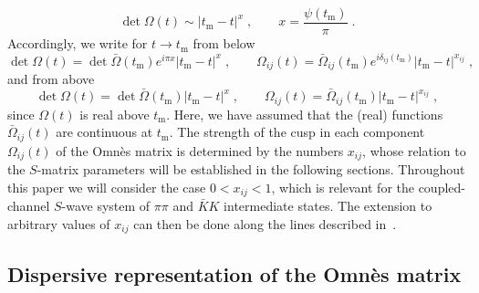 \documentclass[11pt]{article}%
\providecommand{\ec}{\;,}
\providecommand{\ep}{\;.}
\newcommand{\tm}{t_\text{m}}
\newcommand{\beq}{\begin{equation}}
\newcommand{\eeq}{\end{equation}}
\begin{document}
\beq
\label{det_asym}
\det\Omega(t)\sim |\tm-t|^x\ec\qquad x=\frac{\psi(\tm)}{\pi}\ep
\eeq
Accordingly, we write for $t\to\tm$ from below
\beq
\label{def_below}
 \det\Omega(t)=\det\bar\Omega(\tm)e^{i\pi x} |\tm-t|^x\ec\qquad \Omega_{ij}(t)=\bar\Omega_{ij}(\tm)e^{i\delta_{ij}(\tm)}|\tm-t|^{x_{ij}}\ec
\eeq
and from above
\beq
\label{def_above}
 \det\Omega(t)=\det\bar\Omega(\tm) |\tm-t|^x\ec\qquad \Omega_{ij}(t)=\bar\Omega_{ij}(\tm)|\tm-t|^{x_{ij}}\ec
\eeq
since $\Omega(t)$ is real above $\tm$. Here, we have assumed that the (real) functions $\bar\Omega_{ij}(t)$ are continuous at $\tm$. The strength of the cusp in each component $\Omega_{ij}(t)$ of the Omn\`es matrix is determined by the numbers $x_{ij}$, whose relation to the $S$-matrix parameters will be established in the following sections. Throughout this paper we will consider the case $0< x_{ij} < 1$, which is relevant for the coupled-channel $S$-wave system of $\pi\pi$ and $\bar K K$ intermediate states. The extension to arbitrary values of $x_{ij}$ can then be done along the lines described in~\cite{BDM04,HPS}.

\subsection{Dispersive representation of the Omn\`es matrix}
\end{document}
